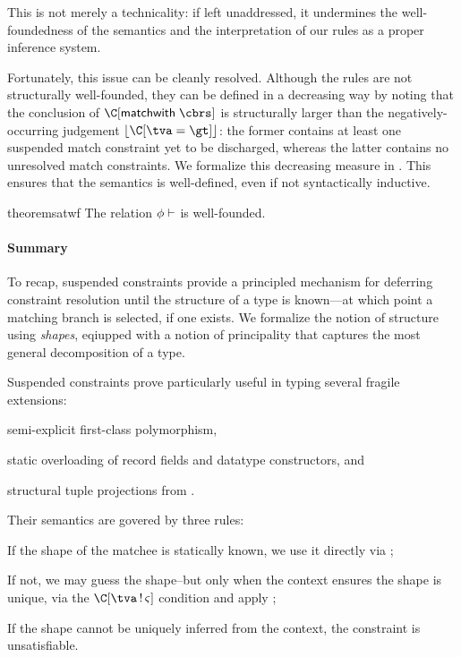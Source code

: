 \documentclass[acmsmall,screen,nonacm,review]{acmart}
\begin{document}
This is not merely a technicality: if left unaddressed, it undermines
the well-foundedness of the semantics and the interpretation of our
rules as a proper inference system.

Fortunately, this issue can be cleanly resolved. Although the rules are not
structurally well-founded, they can be defined in a decreasing way by noting
that the conclusion of  $\C\where{\cmatch \t \cbrs}$ is
structurally larger than the negatively-occurring judgement $\cerase {\C\where{\cunif
\tv \gt}}$: the former contains at least one suspended match constraint yet to be
discharged, whereas the latter contains no unresolved match constraints.
We formalize this decreasing measure in . This ensures that
the semantics is well-defined, even if not syntactically inductive.

\begin{restatable}{theorem}{satwf}
  The relation $\phi \vdash \relax$ is well-founded.
\end{restatable}


\paragraph{Summary}

To recap, suspended constraints provide a principled mechanism
for deferring constraint resolution until the structure of a type
is known---at which point a matching branch is selected, if one exists.
%
We formalize the notion of structure using \emph{shapes}, eqiupped with a
notion of principality that captures the most general decomposition of a
type.

Suspended constraints prove particularly useful in typing several
fragile \ML extensions:
\begin{enumerate*}
  \item semi-explicit first-class polymorphism,
  \item static overloading of record fields and datatype constructors, and
  \item structural tuple projections from \SML.
\end{enumerate*}

Their semantics are govered by three rules:
\begin{enumerate*}
  \item If the shape of the matchee is statically known, we use it
    directly via ;
  \item If not, we may guess the shape--but only when the context ensures
    the shape is unique, via the $\Cshape \C \tv \sh$ condition and apply
    ;
  \item If the shape cannot be uniquely inferred from the context, the constraint
    is unsatisfiable.
\end{enumerate*}
\end{document}
